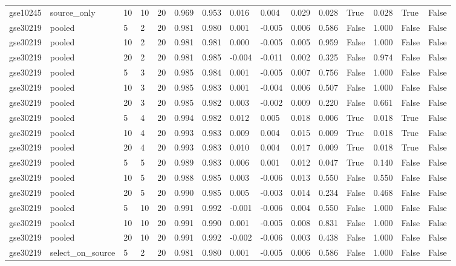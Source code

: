 \begin{table}[t]
\begin{tabular}{lllllllllllllll}
    gse10245 & source\_only & 10 & 10 & 20 & 0.969 & 0.953 & 0.016 & 0.004 & 0.029 & 0.028 & True & 0.028 & True & False \\
    gse30219 & pooled & 5 & 2 & 20 & 0.981 & 0.980 & 0.001 & -0.005 & 0.006 & 0.586 & False & 1.000 & False & False \\
    gse30219 & pooled & 10 & 2 & 20 & 0.981 & 0.981 & 0.000 & -0.005 & 0.005 & 0.959 & False & 1.000 & False & False \\
    gse30219 & pooled & 20 & 2 & 20 & 0.981 & 0.985 & -0.004 & -0.011 & 0.002 & 0.325 & False & 0.974 & False & False \\
    gse30219 & pooled & 5 & 3 & 20 & 0.985 & 0.984 & 0.001 & -0.005 & 0.007 & 0.756 & False & 1.000 & False & False \\
    gse30219 & pooled & 10 & 3 & 20 & 0.985 & 0.983 & 0.001 & -0.004 & 0.006 & 0.507 & False & 1.000 & False & False \\
    gse30219 & pooled & 20 & 3 & 20 & 0.985 & 0.982 & 0.003 & -0.002 & 0.009 & 0.220 & False & 0.661 & False & False \\
    gse30219 & pooled & 5 & 4 & 20 & 0.994 & 0.982 & 0.012 & 0.005 & 0.018 & 0.006 & True & 0.018 & True & False \\
    gse30219 & pooled & 10 & 4 & 20 & 0.993 & 0.983 & 0.009 & 0.004 & 0.015 & 0.009 & True & 0.018 & True & False \\
    gse30219 & pooled & 20 & 4 & 20 & 0.993 & 0.983 & 0.010 & 0.004 & 0.017 & 0.009 & True & 0.018 & True & False \\
    gse30219 & pooled & 5 & 5 & 20 & 0.989 & 0.983 & 0.006 & 0.001 & 0.012 & 0.047 & True & 0.140 & False & False \\
    gse30219 & pooled & 10 & 5 & 20 & 0.988 & 0.985 & 0.003 & -0.006 & 0.013 & 0.550 & False & 0.550 & False & False \\
    gse30219 & pooled & 20 & 5 & 20 & 0.990 & 0.985 & 0.005 & -0.003 & 0.014 & 0.234 & False & 0.468 & False & False \\
    gse30219 & pooled & 5 & 10 & 20 & 0.991 & 0.992 & -0.001 & -0.006 & 0.004 & 0.550 & False & 1.000 & False & False \\
    gse30219 & pooled & 10 & 10 & 20 & 0.991 & 0.990 & 0.001 & -0.005 & 0.008 & 0.831 & False & 1.000 & False & False \\
    gse30219 & pooled & 20 & 10 & 20 & 0.991 & 0.992 & -0.002 & -0.006 & 0.003 & 0.438 & False & 1.000 & False & False \\
    gse30219 & select\_on\_source & 5 & 2 & 20 & 0.981 & 0.980 & 0.001 & -0.005 & 0.006 & 0.586 & False & 1.000 & False & False \\

\end{tabular}
\end{table}
